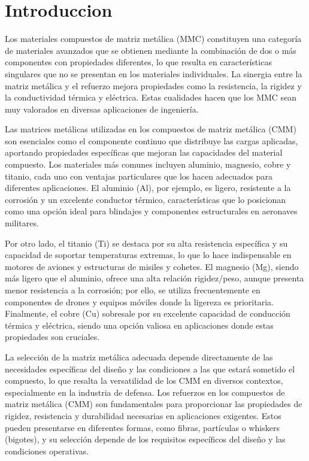 \documentclass[letterpaper, 12pt]{article}
\begin{document}
\newpage

\tableofcontents
\newpage

\section{Introduccion}

Los materiales compuestos de matriz metálica (MMC) constituyen una categoría de
materiales avanzados que se obtienen mediante la combinación de dos o más
componentes con propiedades diferentes, lo que resulta en características
singulares que no se presentan en los materiales individuales. La sinergia
entre la matriz metálica y el refuerzo mejora propiedades como la resistencia,
la rigidez y la conductividad térmica y eléctrica. Estas cualidades hacen que
los MMC sean muy valorados en diversas aplicaciones de ingeniería.

Las matrices metálicas utilizadas en los compuestos de matriz metálica (CMM)
son esenciales como el componente continuo que distribuye las cargas aplicadas,
aportando propiedades específicas que mejoran las capacidades del material
compuesto. Los materiales más comunes incluyen aluminio, magnesio, cobre y
titanio, cada uno con ventajas particulares que los hacen adecuados para
diferentes aplicaciones. El aluminio (Al), por ejemplo, es ligero, resistente a
la corrosión y un excelente conductor térmico, características que lo
posicionan como una opción ideal para blindajes y componentes estructurales en
aeronaves militares.

Por otro lado, el titanio (Ti) se destaca por su alta resistencia específica y
su capacidad de soportar temperaturas extremas, lo que lo hace indispensable en
motores de aviones y estructuras de misiles y cohetes. El magnesio (Mg), siendo
más ligero que el aluminio, ofrece una alta relación rigidez/peso, aunque
presenta menor resistencia a la corrosión; por ello, se utiliza frecuentemente
en componentes de drones y equipos móviles donde la ligereza es prioritaria.
Finalmente, el cobre (Cu) sobresale por su excelente capacidad de conducción
térmica y eléctrica, siendo una opción valiosa en aplicaciones donde estas
propiedades son cruciales.

La selección de la matriz metálica adecuada depende directamente de las
necesidades específicas del diseño y las condiciones a las que estará sometido
el compuesto, lo que resalta la versatilidad de los CMM en diversos contextos,
especialmente en la industria de defensa. Los refuerzos en los compuestos de
matriz metálica (CMM) son fundamentales para proporcionar las propiedades de
rigidez, resistencia y durabilidad necesarias en aplicaciones exigentes. Estos
pueden presentarse en diferentes formas, como fibras, partículas o whiskers
(bigotes), y su selección depende de los requisitos específicos del diseño y
las condiciones operativas.
\end{document}
